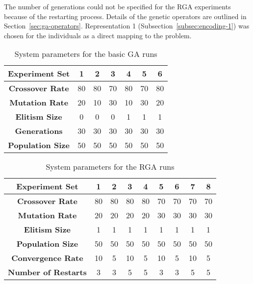 The number of generations could not be specified for the RGA experiments because of the restarting process. Details of the genetic operators are outlined in Section~\ref{sec:ga-operators}. Representation 1 (Subsection~\ref{subsec:encoding-1}) was chosen for the individuals as a direct mapping to the problem. 

\begin{table}
	\centering
	\begin{tabular}{ | >{\bfseries}c | c | c | c | c | c | c | }
		\hline
		Experiment Set & 1 & 2 & 3 & 4 & 5 & 6 \\ \hline
		Crossover Rate & 80 & 80 & 70 & 80 & 70 & 80 \\ \hline
		Mutation Rate & 20 & 10 & 30 & 10 & 30 & 20 \\ \hline
		Elitism Size & 0 & 0 & 0 & 1 & 1 & 1 \\ \hline
		Generations & 30 & 30 & 30 & 30 & 30 & 30 \\ \hline
		Population Size & 50 & 50 & 50 & 50 & 50 & 50 \\ \hline
	\end{tabular}
	\caption{System parameters for the basic GA runs}
	\label{table:viability-ga}
\end{table}

\begin{table}
	\centering
	\begin{tabular}{ | >{\bfseries}c | c | c | c | c | c | c | c | c | }
		\hline
		Experiment Set & 1 & 2 & 3 & 4 & 5 & 6 & 7 & 8 \\ \hline
		Crossover Rate & 80 & 80 & 80 & 80 & 70 & 70 & 70 & 70 \\ \hline
		Mutation Rate & 20 & 20 & 20 & 20 & 30 & 30 & 30 & 30 \\ \hline
		Elitism Size & 1 & 1 & 1 & 1 & 1 & 1 & 1 & 1 \\ \hline
		Population Size & 50 & 50 & 50 & 50 & 50 & 50 & 50 & 50 \\ \hline
		Convergence Rate & 10 & 5 & 10 & 5 & 10 & 5 & 10 & 5 \\ \hline
		Number of Restarts & 3 & 3 & 5 & 5 & 3 & 3 & 5 & 5 \\ \hline
	\end{tabular}
	\caption{System parameters for the RGA runs}
	\label{table:viability-rga}
\end{table}